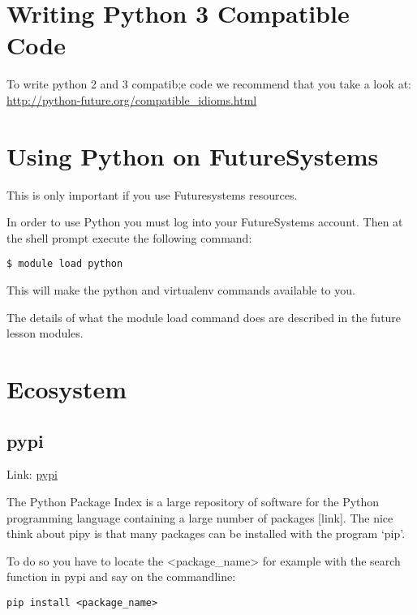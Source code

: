 \section{Writing Python 3 Compatible
Code}\label{writing-python-3-compatible-code}

To write python 2 and 3 compatib;e code we recommend that you take a
look at: \url{http://python-future.org/compatible_idioms.html}

\section{Using Python on
FutureSystems}\label{using-python-on-futuresystems}

This is only important if you use Futuresystems resources.

In order to use Python you must log into your FutureSystems account.
Then at the shell prompt execute the following command:

\begin{verbatim}
$ module load python
\end{verbatim}

This will make the python and virtualenv commands available to you.

The details of what the module load command does are described in the
future lesson modules.

\section{Ecosystem}\label{ecosystem}

\subsection{pypi}\label{pypi}

Link: \href{https://pypi.python.org/pypi}{pypi}

The Python Package Index is a large repository of software for the
Python programming language containing a large number of packages
{[}link{]}. The nice think about pipy is that many packages can be
installed with the program `pip'.

To do so you have to locate the \textless{}package\_name\textgreater{}
for example with the search function in pypi and say on the commandline:

\begin{verbatim}
pip install <package_name>
\end{verbatim}

